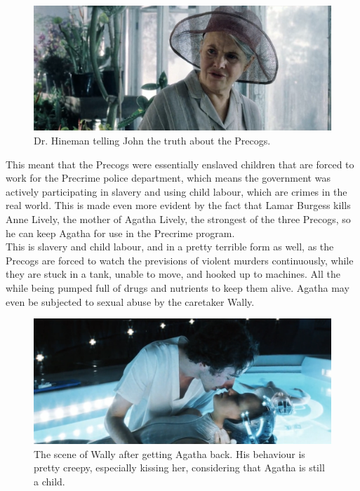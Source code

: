 \documentclass[11pt]{article}
\begin{document}
\begin{figure}[htbp]
\centering
\includegraphics[width=.9\linewidth]{./images/dr-hineman-telling-john-the-truth-about-the-precogs.png}
\caption{Dr. Hineman telling John the truth about the Precogs.}
\end{figure}

 \newpage

This meant that the Precogs were essentially enslaved children that
are forced to work for the Precrime police department, which means
the government was actively participating in slavery and using
child labour, which are crimes in the real world.
This is made even more evident by the fact that Lamar Burgess kills
Anne Lively, the mother of Agatha Lively, the strongest of the three
Precogs, so he can keep Agatha for use in the
Precrime program.  \\

This is slavery and child labour, and in a pretty terrible
form as well, as the Precogs are forced to
watch the previsions of violent murders
continuously, while they are stuck in a tank, unable to move,
and hooked up to machines. All the while being pumped full of drugs
and nutrients to keep them alive. Agatha may even be subjected to
sexual abuse by the caretaker Wally.

\begin{figure}[htbp]
\centering
\includegraphics[width=.9\linewidth]{./images/wally-creepy-behaviour-after-getting-agatha-back.png}
\caption{The scene of Wally after getting Agatha back. His behaviour is pretty creepy, especially kissing her, considering that Agatha is still a child.}
\end{figure}
\end{document}
